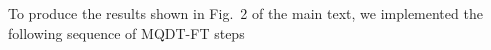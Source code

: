 \documentclass[reprint,amssymb,noeprint,twocolumn,longbibliography]{revtex4-2}
\begin{document}




\vspace{0.5cm}
To produce the results shown in Fig.~2 of the main text, we implemented the following sequence of MQDT-FT steps
\end{document}
